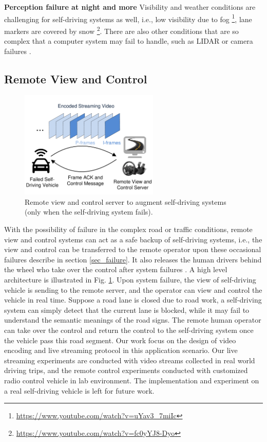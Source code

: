 \textbf{Perception failure at night and more}
Visibility and weather conditions are challenging for self-driving 
systems as well, 
i.e., low visibility due to fog \footnote{\url{https://www.youtube.com/watch?v=uYav3_7miIc}},
lane markers are covered by snow
\footnote{\url{https://www.youtube.com/watch?v=fc0yYJ8-Dyo}}.
There are also other conditions that are so complex
that a computer system may fail to handle, such as 
LIDAR or camera failures \cite{waymo}.


\subsection{Remote View and Control}


\begin{figure}[t]
\centering
\vspace{-0.2cm}
\includegraphics[width=2.6in,angle=0]{Figs/RTDrive/illustration.pdf}
\vspace{-0.4cm}
\caption{Remote view and control server to augment self-driving systems
(only when the self-driving system fails).}
\vspace{-0.4cm}
\label{illustration}
\centering
\end{figure}

With the possibility of failure in the complex road or traffic
conditions, remote view and control systems can act as a safe backup
of self-driving systems, 
i.e., the view and control can be transferred to the remote
operator upon these occasional failures describe in section \ref{sec_failure}. 
It also releases the human drivers behind the wheel who take over the 
control after system failures \cite{waymo}. 
A high level architecture is illustrated in Fig. \ref{illustration}.  
Upon system failure, the view of self-driving vehicle
is sending to the remote server, 
and the operator can view and control the vehicle in real time. 
Suppose a road lane is closed due to road work, 
a self-driving system can simply detect
that the current lane is blocked,
while it may fail to understand the semantic meanings
of the road signs. 
The remote human operator can take over the control and 
return the control to the self-driving system once the vehicle pass this road segment. 
Our work focus on the design of video encoding and live streaming protocol
in this application scenario. 
Our live streaming experiments are conducted with video streams
collected in real world driving trips, 
and the remote control experiments conducted with customized 
radio control vehicle in lab environment. 
The implementation and experiment on a real self-driving vehicle 
is left for future work. 




